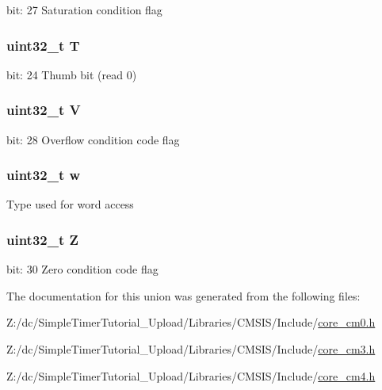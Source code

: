 bit\-: 27 Saturation condition flag \hypertarget{unionx_p_s_r___type_a6e1cf12e53a20224f6f62c001d9be972}{
\subsubsection[{T}]{\setlength{\rightskip}{0pt plus 5cm}uint32\-\_\-t T}}\label{unionx_p_s_r___type_a6e1cf12e53a20224f6f62c001d9be972}
bit\-: 24 Thumb bit (read 0) \hypertarget{unionx_p_s_r___type_acd4a2b64faee91e4a9eef300667fa222}{
\subsubsection[{V}]{\setlength{\rightskip}{0pt plus 5cm}uint32\-\_\-t V}}\label{unionx_p_s_r___type_acd4a2b64faee91e4a9eef300667fa222}
bit\-: 28 Overflow condition code flag \hypertarget{unionx_p_s_r___type_ad0fb62e7a08e70fc5e0a76b67809f84b}{
\subsubsection[{w}]{\setlength{\rightskip}{0pt plus 5cm}uint32\-\_\-t w}}\label{unionx_p_s_r___type_ad0fb62e7a08e70fc5e0a76b67809f84b}
Type used for word access \hypertarget{unionx_p_s_r___type_a5ae954cbd9986cd64625d7fa00943c8e}{
\subsubsection[{Z}]{\setlength{\rightskip}{0pt plus 5cm}uint32\-\_\-t Z}}\label{unionx_p_s_r___type_a5ae954cbd9986cd64625d7fa00943c8e}
bit\-: 30 Zero condition code flag 

The documentation for this union was generated from the following files\-:\begin{DoxyCompactItemize}
\item 
Z\-:/dc/\-Simple\-Timer\-Tutorial\-\_\-\-Upload/\-Libraries/\-C\-M\-S\-I\-S/\-Include/\hyperlink{core__cm0_8h}{core\-\_\-cm0.\-h}\item 
Z\-:/dc/\-Simple\-Timer\-Tutorial\-\_\-\-Upload/\-Libraries/\-C\-M\-S\-I\-S/\-Include/\hyperlink{core__cm3_8h}{core\-\_\-cm3.\-h}\item 
Z\-:/dc/\-Simple\-Timer\-Tutorial\-\_\-\-Upload/\-Libraries/\-C\-M\-S\-I\-S/\-Include/\hyperlink{core__cm4_8h}{core\-\_\-cm4.\-h}\end{DoxyCompactItemize}
